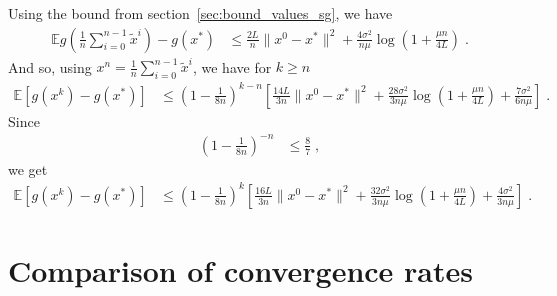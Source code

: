 \documentclass{article}
\def\E{_{\scriptscriptstyle E}}
\def \E{{\mathbb E}}
\def \E{{\mathbb E}}
\begin{document}
Using the bound from section~\ref{sec:bound_values_sg}, we have
\begin{align*}
\E g\left(\frac{1}{n}\sum_{i=0}^{n-1}\tilde{x}^{i}\right) - g(x^\ast) & \leqslant \frac{2L}{n}\| x^0 - x^\ast\|^2 + \frac{4 \sigma^2 }{n \mu} \log\left( 1 + \frac{\mu n }{4L } \right) \; .
\end{align*}
And so, using $x^n = \frac{1}{n}\sum_{i=0}^{n-1}\tilde{x}^{i}$, we have for $k \geqslant n$
\begin{align*}
\E\left[g(x^k) - g(x^\ast)\right] & \leqslant \left(1 - \frac{1}{8n}\right)^{k-n} \left[\frac{14L}{3n}\| x^0 - x^\ast\|^2 + \frac{28 \sigma^2 }{3n \mu} \log\left( 1 + \frac{\mu n }{4L } \right) + \frac{7\sigma^2}{6n\mu}\right] \; .
\end{align*}
Since
\begin{align*}
\left(1 - \frac{1}{8n}\right)^{-n} &\leqslant \frac{8}{7} \; ,
\end{align*}
we get
\begin{align*}
\E\left[g(x^k) - g(x^\ast)\right] & \leqslant \left(1 - \frac{1}{8n}\right)^k \left[\frac{16L}{3n}\| x^0 - x^\ast\|^2 + \frac{32 \sigma^2 }{3n \mu} \log\left( 1 + \frac{\mu n }{4L } \right) + \frac{4\sigma^2}{3n\mu}\right] \; .
\end{align*}


\section{Comparison of convergence rates}
\end{document}
